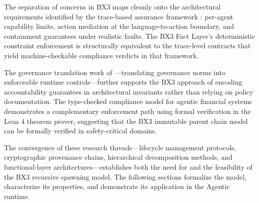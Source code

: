 The separation of concerns in BX3 maps cleanly onto the architectural requirements identified by the trace-based assurance framework \cite{trace-based-assurance}: per-agent capability limits, action mediation at the language-to-action boundary, and containment guarantees under realistic faults. The BX3 Fact Layer's deterministic constraint enforcement is structurally equivalent to the trace-level contracts that yield machine-checkable compliance verdicts in that framework.

The governance translation work of ---translating governance norms into enforceable runtime controls---further supports the BX3 approach of encoding accountability guarantees in architectural invariants rather than relying on policy documentation. The type-checked compliance model for agentic financial systems \cite{rashie2026} demonstrates a complementary enforcement path using formal verification in the Lean 4 theorem prover, suggesting that the BX3 immutable parent chain model can be formally verified in safety-critical domains.

The convergence of these research threads---lifecycle management protocols, cryptographic provenance chains, hierarchical decomposition methods, and functional-layer architectures---establishes both the need for and the feasibility of the BX3 recursive spawning model. The following sections formalize the model, characterize its properties, and demonstrate its application in the Agentic runtime.